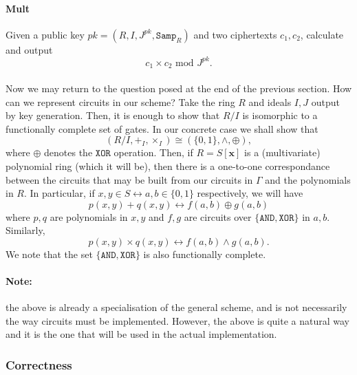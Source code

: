 \documentclass{article}
\theoremstyle{definition}
\theoremstyle{example}
\renewcommand{\mod}{\,\,\text{mod}\,\,}
\newcommand{\Samp}{\texttt{Samp}}
\renewcommand{\vec}[1]{\mathbf{#1}}
\begin{document}
\paragraph{Mult} Given a public key $pk = (R, I, J^{pk}, \Samp_R)$ and two
ciphertexts $c_1, c_2$, calculate and output
\[
  c_1 \times c_2 \mod J^{pk}.
\]
\paragraph{} Now we may return to the question posed at the end of the previous
section. How can we represent circuits in our scheme? Take the ring $R$ and
ideals $I, J$ output by key generation. Then, it is enough to show that $R/I$ is
isomorphic to a functionally complete set of gates. In our concrete case we shall show that
\[
  (R/I, +_I, \times_I) \cong (\{0, 1\}, \land, \oplus),
\]
where $\oplus$ denotes the $\texttt{XOR}$ operation. Then, if $R = S[\vec{x}]$ is a (multivariate)
polynomial ring (which it will be), then there is a one-to-one correspondance
between the circuits that may be built from our circuits in $\Gamma$ and the
polynomials in $R$. In particular, if $x, y \in S \leftrightarrow a, b \in \{0, 1\}$
respectively, we will have
\[
  p(x, y) + q(x, y) \leftrightarrow f(a, b) \oplus g(a, b)
\]
where $p, q$ are polynomials in $x, y$ and $f, g$ are circuits over
$\{\texttt{AND}, \texttt{XOR}\}$ in $a,
b$. Similarly,
\[
  p(x, y) \times q(x, y) \leftrightarrow f(a, b) \land g(a, b).
\]
We note that the set $\{\texttt{AND}, \texttt{XOR}\}$ is also functionally complete.
\paragraph{Note:} the above is already a specialisation of the general scheme,
and is not necessarily the way circuits must be implemented. However, the above
is quite a natural way and it is the one that will be used in the actual implementation.
\subsubsection{Correctness}
\end{document}
